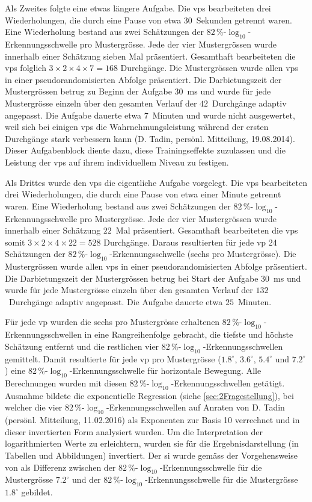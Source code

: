 \documentclass[11pt, twoside, a4paper]{book}		%
\begin{document}
Als Zweites folgte eine etwas längere Aufgabe. Die \glspl{vp} bearbeiteten drei Wiederholungen, die durch eine Pause von etwa $30$~Sekunden getrennt waren. Eine Wiederholung bestand aus zwei Schätzungen der $82\,\%$-$\log_{10}$-Erkennungsschwelle pro Mustergrösse. Jede der vier Mustergrössen wurde innerhalb einer Schätzung sieben Mal präsentiert. Gesamthaft bearbeiteten die \glspl{vp} folglich $3 \times 2 \times 4 \times 7 = 168$ Durchgänge. Die Mustergrössen wurde allen \glspl{vp} in einer pseudorandomisierten Abfolge präsentiert. Die Darbietungszeit der Mustergrössen betrug zu Beginn der Aufgabe $30$~ms und wurde für jede Mustergrösse einzeln über den gesamten Verlauf der $42$~Durchgänge adaptiv angepasst. Die Aufgabe dauerte etwa $7$~Minuten und wurde nicht ausgewertet, weil sich bei einigen \glspl{vp} die Wahrnehmungsleistung während der ersten Durchgänge stark verbessern kann (D. Tadin, persönl. Mitteilung, 19.08.2014). Dieser Aufgabenblock diente dazu, diese Trainingseffekte zuzulassen und die Leistung der \glspl{vp} auf ihrem individuellem Niveau zu festigen. 

Als Drittes wurde den \glspl{vp} die eigentliche Aufgabe vorgelegt. Die \glspl{vp} bearbeiteten drei Wiederholungen, die durch eine Pause von etwa einer Minute getrennt waren. Eine Wiederholung bestand aus zwei Schätzungen der $82\,\%$-$\log_{10}$-Erkennungsschwelle pro Mustergrösse. Jede der vier Mustergrössen wurde innerhalb einer Schätzung $22$~Mal präsentiert. Gesamthaft bearbeiteten die \glspl{vp} somit $3 \times 2 \times 4 \times 22 = 528$ Durchgänge. 
Daraus resultierten für jede \gls{vp} 24 Schätzungen der $82\,\%$-$\log_{10}$-Erkennungsschwelle (sechs pro Mustergrösse).
Die Mustergrössen wurde allen \glspl{vp} in einer pseudorandomisierten Abfolge präsentiert. Die Darbietungszeit der Mustergrössen betrug bei Start der Aufgabe $30$~ms und wurde für jede Mustergrösse einzeln über den gesamten Verlauf der $132$~Durchgänge adaptiv angepasst. 
Die Aufgabe dauerte etwa $25$~Minuten. 

Für jede \gls{vp} wurden die sechs pro Mustergrösse erhaltenen $82\,\%$-$\log_{10}$-Erkennungsschwellen in eine Rangreihenfolge gebracht, die tiefste und höchste Schätzung entfernt und die restlichen vier $82\,\%$-$\log_{10}$-Erkennungsschwellen gemittelt. Damit resultierte für jede \gls{vp} pro Mustergrösse ($1.8^{\circ}$, $3.6^{\circ}$, $5.4^{\circ}$ und $7.2^{\circ}$) eine $82\,\%$-$\log_{10}$-Erkennungsschwelle für horizontale Bewegung. 
Alle Berechnungen wurden mit diesen $82\,\%$-$\log_{10}$-Erkennungsschwellen getätigt. 
Ausnahme bildete die exponentielle Regression (siehe \autoref{sec:2Fragestellung}), bei welcher die vier $82\,\%$-$\log_{10}$-Erkennungsschwellen auf Anraten von D. Tadin (persönl. Mitteilung, 11.02.2016) als Exponenten zur Basis 10 verrechnet und in dieser invertierten Form analysiert wurden.
Um die Interpretation der logarithmierten Werte zu erleichtern, wurden sie für die Ergebnisdarstellung (in Tabellen und Abbildungen) invertiert.
Der \gls{si} wurde gemäss der Vorgehensweise von \citet{Melnick2013} als Differenz zwischen der $82\,\%$-$\log_{10}$-Erkennungsschwelle für die Mustergrösse $7.2^{\circ}$ und der $82\,\%$-$\log_{10}$-Erkennungsschwelle für die Mustergrösse $1.8^{\circ}$ gebildet. 
\end{document}
